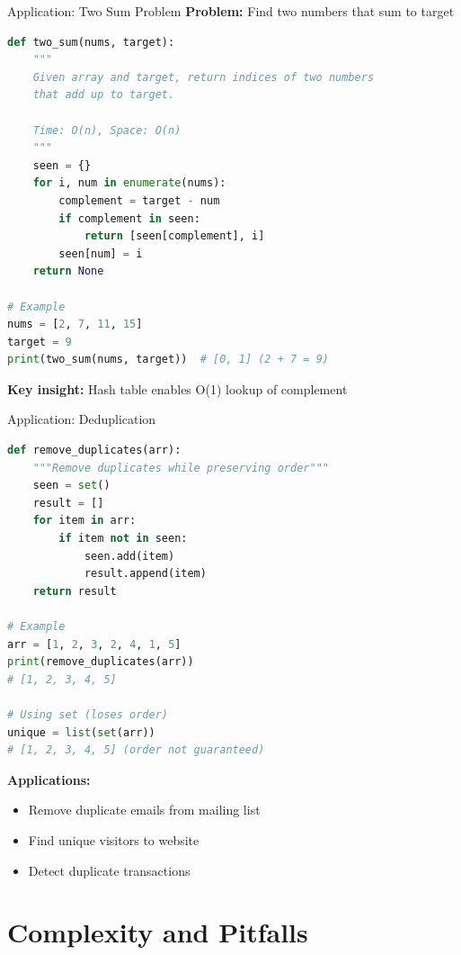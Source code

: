 \documentclass[aspectratio=169]{beamer}
\begin{document}
\begin{frame}[fragile]{Application: Two Sum Problem}
  \textbf{Problem:} Find two numbers that sum to target

  \begin{lstlisting}[language=Python, basicstyle=\ttfamily\small]
def two_sum(nums, target):
    """
    Given array and target, return indices of two numbers
    that add up to target.

    Time: O(n), Space: O(n)
    """
    seen = {}
    for i, num in enumerate(nums):
        complement = target - num
        if complement in seen:
            return [seen[complement], i]
        seen[num] = i
    return None

# Example
nums = [2, 7, 11, 15]
target = 9
print(two_sum(nums, target))  # [0, 1] (2 + 7 = 9)
  \end{lstlisting}

  \vspace{0.3cm}
  \textbf{Key insight:} Hash table enables O(1) lookup of complement
\end{frame}

\begin{frame}[fragile]{Application: Deduplication}
  \begin{lstlisting}[language=Python, basicstyle=\ttfamily\small]
def remove_duplicates(arr):
    """Remove duplicates while preserving order"""
    seen = set()
    result = []
    for item in arr:
        if item not in seen:
            seen.add(item)
            result.append(item)
    return result

# Example
arr = [1, 2, 3, 2, 4, 1, 5]
print(remove_duplicates(arr))
# [1, 2, 3, 4, 5]

# Using set (loses order)
unique = list(set(arr))
# [1, 2, 3, 4, 5] (order not guaranteed)
  \end{lstlisting}

  \vspace{0.3cm}
  \textbf{Applications:}
  \begin{itemize}
    \item Remove duplicate emails from mailing list
    \item Find unique visitors to website
    \item Detect duplicate transactions
  \end{itemize}
\end{frame}

\section{Complexity and Pitfalls}
\end{document}
